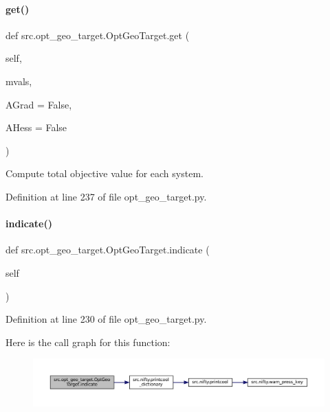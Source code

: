 \paragraph{\texorpdfstring{get()}{get()}}
{\footnotesize\ttfamily def src.\+opt\+\_\+geo\+\_\+target.\+Opt\+Geo\+Target.\+get (\begin{DoxyParamCaption}\item[{}]{self,  }\item[{}]{mvals,  }\item[{}]{A\+Grad = {\ttfamily False},  }\item[{}]{A\+Hess = {\ttfamily False} }\end{DoxyParamCaption})}



Compute total objective value for each system. 



Definition at line 237 of file opt\+\_\+geo\+\_\+target.\+py.

\mbox{\label{classsrc_1_1opt__geo__target_1_1OptGeoTarget_ae16187c64e7ecd1e7adae8a3387a1c49}} 
\paragraph{\texorpdfstring{indicate()}{indicate()}}
{\footnotesize\ttfamily def src.\+opt\+\_\+geo\+\_\+target.\+Opt\+Geo\+Target.\+indicate (\begin{DoxyParamCaption}\item[{}]{self }\end{DoxyParamCaption})}



Definition at line 230 of file opt\+\_\+geo\+\_\+target.\+py.

Here is the call graph for this function\+:
\nopagebreak
\begin{figure}[H]
\begin{center}
\leavevmode
\includegraphics[width=350pt]{classsrc_1_1opt__geo__target_1_1OptGeoTarget_ae16187c64e7ecd1e7adae8a3387a1c49_cgraph}
\end{center}
\end{figure}
\mbox{\label{classsrc_1_1opt__geo__target_1_1OptGeoTarget_ad20376e926556e19798b72be33516ba9}} 
